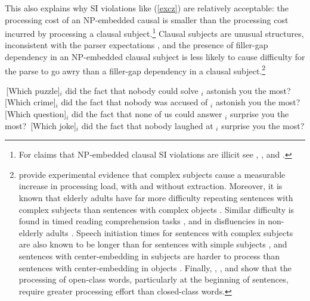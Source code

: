 \documentclass[output=paper
	        ,collection
	        ,collectionchapter
 	        ,biblatex
                ,babelshorthands
                ,newtxmath
                ,draftmode
                ,colorlinks, citecolor=brown
]{langscibook}
\begin{document}
This also explains why SI violations like  (\ref{excz}) are relatively acceptable: the  processing cost of an NP-embedded 
causal  is smaller than the processing cost incurred by processing a clausal subject.\footnote{For claims that NP-embedded clausal SI violations are illicit see  \citet[42]{lasniksaito},   \citet[796]{colinphillips}, and    \citet[67]{colin_horn}.}  Clausal subjects are unusual structures, inconsistent with the parser expectations \citep{fod74},  and   the presence of filler-gap dependency in an  NP-embedded clausal subject is less likely
to cause  difficulty for the parse to go awry than a  filler-gap dependency in a clausal subject.\footnote{\citet{clausen,clausencuny} provide  experimental evidence that  complex subjects cause  a measurable increase in processing load,  with and without extraction. Moreover,  it is known that 
elderly adults  have far more difficulty repeating sentences with complex subjects than sentences with complex objects  \citep{kemper86}. Similar difficulty is  found in timed reading comprehension tasks  \citep{kynette}, and in   disfluencies in non-elderly adults \citep{clarkwasow}. 
Speech initiation times  for sentences with complex subjects are
also known to be longer than for sentences with 
 simple subjects  \citep{ferreirasubj,tsiam},
 and sentences with center-embedding in subjects 
are harder to process than sentences 
with center-embedding in objects \citep{amy,eady}.
Finally,  \citet{garnsey}, \citet{kutasetal}, and \citet{vanpetten}  show
that the processing of open-class words, particularly at
the beginning of sentences, require
greater processing effort than closed-class words.}


\eal \label{excz}
\ex  \,[Which puzzle]$_i$ did the fact that nobody could solve \spc$_i$ astonish you the most?
\ex \,[Which crime]$_i$ did the fact that nobody was accused of \spc$_i$ astonish you the most?
\ex \,[Which question]$_i$ did the fact that none of us could answer \spc$_i$  surprise you the most?
\ex \,[Which joke]$_i$ did the fact that nobody laughed at \spc$_i$ surprise you the most?
\zl
\end{document}
